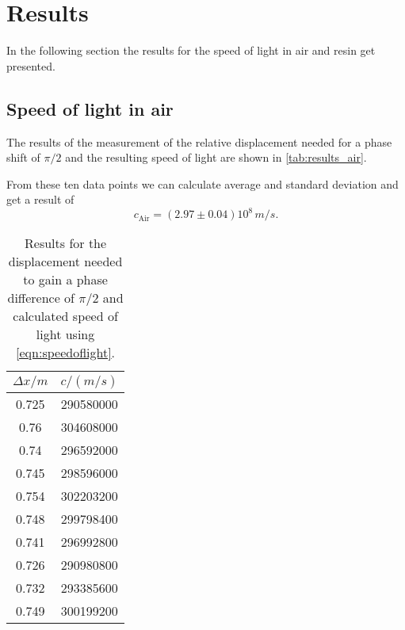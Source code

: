 \section{Results}
\label{sec:results}
In the following section the results for the speed of light in air and resin get presented.

\subsection{Speed of light in air}
The results of the measurement of the relative displacement needed for a phase shift of $\pi / 2$ and
the resulting speed of light are shown in \autoref{tab:results_air}.

From these ten data points we can calculate average and standard deviation and get a result of
\begin{equation}
  c_\text{Air} = (2.97 \pm 0.04) 10^8 \, \si{m/s}.
\end{equation}

\begin{table}
  \centering
  \caption{Results for the displacement needed to gain a phase difference of $\pi/2$ and
  calculated speed of light using \autoref{eqn:speedoflight}.}
  \label{tab:results_air}
  \begin{tabular}{c | c}
    $\Delta x / \si{m}$ & $c / (\si{m/s})$\\
    \hline
    0.725 & 290580000\\
    0.76  & 304608000\\
    0.74  & 296592000\\
    0.745 & 298596000\\
    0.754 & 302203200\\
    0.748 & 299798400\\
    0.741 & 296992800\\
    0.726 & 290980800\\
    0.732 & 293385600\\
    0.749 & 300199200\\
  \end{tabular}
\end{table}


